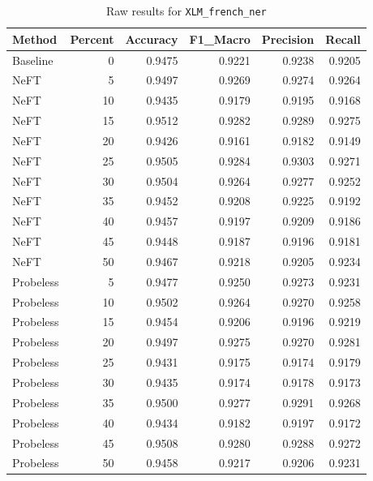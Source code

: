 \documentclass[12pt]{article}
\begin{document}
\begin{table}[H]
\centering
\caption{Raw results for \texttt{XLM\_french\_ner}}
\label{tab:xlm-french-ner}
\begin{tabular}{lrrrrr}
\toprule
Method & Percent & Accuracy & F1\_Macro & Precision & Recall \\
\midrule
Baseline & 0 & 0.9475 & 0.9221 & 0.9238 & 0.9205 \\
NeFT & 5 & 0.9497 & 0.9269 & 0.9274 & 0.9264 \\
NeFT & 10 & 0.9435 & 0.9179 & 0.9195 & 0.9168 \\
NeFT & 15 & 0.9512 & 0.9282 & 0.9289 & 0.9275 \\
NeFT & 20 & 0.9426 & 0.9161 & 0.9182 & 0.9149 \\
NeFT & 25 & 0.9505 & 0.9284 & 0.9303 & 0.9271 \\
NeFT & 30 & 0.9504 & 0.9264 & 0.9277 & 0.9252 \\
NeFT & 35 & 0.9452 & 0.9208 & 0.9225 & 0.9192 \\
NeFT & 40 & 0.9457 & 0.9197 & 0.9209 & 0.9186 \\
NeFT & 45 & 0.9448 & 0.9187 & 0.9196 & 0.9181 \\
NeFT & 50 & 0.9467 & 0.9218 & 0.9205 & 0.9234 \\
Probeless & 5 & 0.9477 & 0.9250 & 0.9273 & 0.9231 \\
Probeless & 10 & 0.9502 & 0.9264 & 0.9270 & 0.9258 \\
Probeless & 15 & 0.9454 & 0.9206 & 0.9196 & 0.9219 \\
Probeless & 20 & 0.9497 & 0.9275 & 0.9270 & 0.9281 \\
Probeless & 25 & 0.9431 & 0.9175 & 0.9174 & 0.9179 \\
Probeless & 30 & 0.9435 & 0.9174 & 0.9178 & 0.9173 \\
Probeless & 35 & 0.9500 & 0.9277 & 0.9291 & 0.9268 \\
Probeless & 40 & 0.9434 & 0.9182 & 0.9197 & 0.9172 \\
Probeless & 45 & 0.9508 & 0.9280 & 0.9288 & 0.9272 \\
Probeless & 50 & 0.9458 & 0.9217 & 0.9206 & 0.9231 \\
\bottomrule
\end{tabular}
\end{table}
\end{document}
